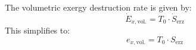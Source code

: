 The volumetric exergy destruction rate is given by:  
\[
\dot{E}_{x,\text{vol.}} = T_0 \cdot \dot{S}_{\text{erz}}
\]  
This simplifies to:  
\[
e_{x,\text{vol.}} = T_0 \cdot S_{\text{erz}}
\]